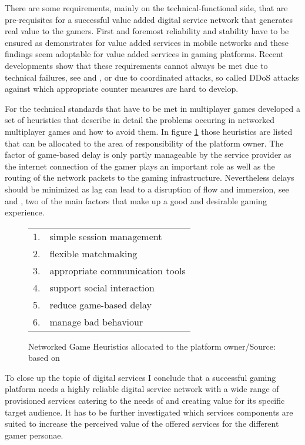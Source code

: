 \documentclass
[
    a4paper,
    11pt
]
{article}
\begin{document}
There are some requirements, mainly on the technical-functional side, that are pre-requisites for a successful
value added digital service network that generates real value to the gamers. First and foremost reliability
and stability have to be ensured as \cite{Kuo2009a} demonstrates
for value added services in mobile networks and these findings seem adoptable for
value added services in gaming platforms. Recent developments show that these requirements
cannot always be met due to technical failures, see \cite{Jones2016} and \cite{Grubb2016}, or due to coordinated
attacks, so called DDoS attacks \cite{Walton2015} against which appropriate
counter measures are hard to develop.

For the technical standards that have to be met in multiplayer games \cite{Pinelle2009}
developed a set of heuristics that describe in detail the problems occuring in networked multiplayer games and how
to avoid them. In figure \ref{tab:networkedgameheuristics} those heuristics are listed that can be allocated to the
area of responsibility of the platform owner. The factor of game-based delay is only partly manageable by the
service provider as the internet connection of the gamer plays an important role as well as the routing of the
network packets to the gaming infrastructure. Nevertheless delays should be minimized as lag can lead to a
disruption of flow and immersion, see \cite{Chen2006} and \cite{Ries2008}, two
of the main factors that make up a good and desirable gaming experience.

\begin{figure}[h]
    \centering
    \small
    \begin{tabular}{l l }
      \hline
      1.      &     simple session management\\
			2.      &     flexible matchmaking\\
			3.      &     appropriate communication tools\\
			4.      &     support social interaction\\
			5.      &     reduce game-based delay\\
			6.      &     manage bad behaviour\\
      \hline
    \end{tabular}
    \caption{Networked Game Heuristics allocated to the platform owner/Source: based on \cite{Pinelle2009} }
    \label{tab:networkedgameheuristics}
\end{figure}

To close up the topic of digital services I conclude that a successful gaming
platform needs a highly reliable digital service network with a
wide range of provisioned services catering to the needs of and creating
value for its specific target audience. It has to be further investigated
which services components are suited to increase the perceived value of the
offered services for the different gamer personae.
%
\end{document}

